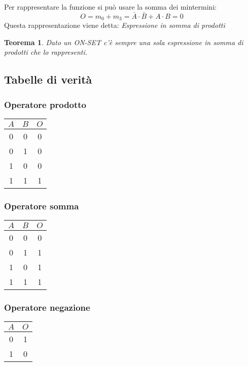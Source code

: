\documentclass[a4paper]{article}
\newtheorem{theorem}{Teorema}
\theoremstyle{break}
\theoremstyle{break}
\theoremstyle{break}
\theoremstyle{break}
\begin{document}
\begin{example}
	Per rappresentare la funzione si può usare la somma dei mintermini:
	\[
		O = m_0 + m_3 = \bar{A} \cdot \bar{B} + A \cdot B = 0
	\]
	Questa rappresentazione viene detta: \emph{Espressione in somma di prodotti}
	\begin{theorem}
		Dato un ON-SET c'è sempre una sola espressione in somma di prodotti che lo
		rappresenti.
	\end{theorem}
	\label{ex:modelloAB}
\end{example}

\subsection{Tabelle di verità}
\subsubsection{Operatore prodotto}
\begin{center}
	\begin{tabular}{c|c|c}
		\( A \) & \( B \) & \( O \) \\
		\hline
		0       & 0       & 0       \\
		0       & 1       & 0       \\
		1       & 0       & 0       \\
		1       & 1       & 1       \\
	\end{tabular}
\end{center}

\subsubsection{Operatore somma}
\begin{center}
	\begin{tabular}{c|c|c}
		\( A \) & \( B \) & \( O \) \\
		\hline
		0       & 0       & 0       \\
		0       & 1       & 1       \\
		1       & 0       & 1       \\
		1       & 1       & 1       \\
	\end{tabular}
\end{center}

\subsubsection{Operatore negazione}
\begin{center}
	\begin{tabular}{c|c}
		\( A \) & \( O \) \\
		\hline
		0       & 1       \\
		1       & 0       \\
	\end{tabular}
\end{center}
\end{document}
